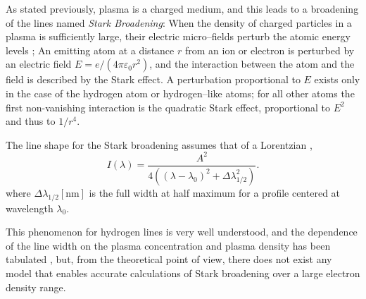 \documentclass[../main.tex]{subfiles}
\begin{document}



As stated previously, plasma is a charged medium, and this leads to a broadening of the lines named \textit{Stark Broadening}: When the density of charged particles in a plasma is sufficiently large, their electric micro--fields perturb the atomic energy levels \cite{Griem1974SpectralPlasmas.}; An emitting atom at a distance $r$ from an ion or electron is perturbed by an electric field $E=e/(4\pi \varepsilon_0 r^2)$, and the interaction between the atom and the field is described by the Stark effect. A perturbation proportional to $E$ exists only in the case of the hydrogen atom or hydrogen--like atoms; for all other atoms the first non-vanishing interaction is the quadratic Stark effect\cite{Thorne1988Spectrophysics}, proportional to $E^2$ and thus to $1/r^4$.

The line shape for the Stark broadening assumes that of a Lorentzian \cite{Wiese1965PlasmaTechniques,Hutchinson2002PrinciplesDiagnostics},
\begin{equation}
I\left( \lambda \right)=\frac{A^2}{4\left( \left(\lambda-\lambda_0\right)^2+\Delta \lambda_{1/2}^2\right)}. \label{eq:Stark_Broadening}
\end{equation}
where $\Delta \lambda_{1/2}\left[\si{\nm}\right]$ is the full width at half maximum for a profile centered at wavelength $\lambda_0$.

This phenomenon for hydrogen lines is very well understood, and the dependence of the line width on the plasma concentration and plasma density has been tabulated \cite{Griem1964PlasmaSpectroscopy,Griem1974SpectralPlasmas.}, but, from the theoretical point of view, there does not exist any model that enables accurate calculations of Stark broadening over a large electron density range\cite{Griem2000StarkPlasmas}. 
\end{document}
